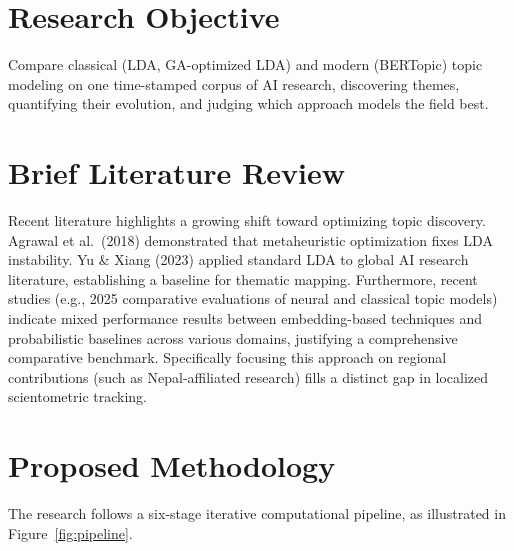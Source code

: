 \documentclass[11pt,a4paper]{article}
\begin{document}
\section{Research Objective}
Compare classical (LDA, GA-optimized LDA) and modern (BERTopic) topic
modeling on one time-stamped corpus of AI research, discovering themes,
quantifying their evolution, and judging which approach models the field
best.

\section{Brief Literature Review}
Recent literature highlights a growing shift toward optimizing topic
discovery. Agrawal et al.\ (2018) demonstrated that metaheuristic
optimization fixes LDA instability. Yu \& Xiang (2023) applied standard
LDA to global AI research literature, establishing a baseline for
thematic mapping. Furthermore, recent studies (e.g., 2025 comparative
evaluations of neural and classical topic models) indicate mixed
performance results between embedding-based techniques and probabilistic
baselines across various domains, justifying a comprehensive comparative
benchmark. Specifically focusing this approach on regional contributions
(such as Nepal-affiliated research) fills a distinct gap in localized
scientometric tracking.

\section{Proposed Methodology}
The research follows a six-stage iterative computational pipeline, as
illustrated in Figure~\ref{fig:pipeline}.
\end{document}
